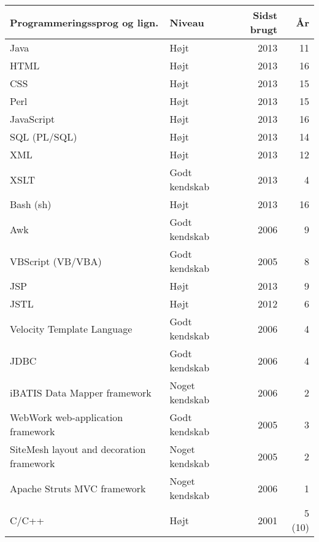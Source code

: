 \documentclass[a4paper,11pt]{article}
\begin{document}
\bigskip
\begin{tabularx}{\textwidth}{X l r r}
  \textbf{Programmeringssprog og lign.}  & \textbf{Niveau}  & \textbf{Sidst brugt}  & \textbf{År} \\
  \hline
  Java                                      & Højt            & 2013  &    11 \\
  HTML                                      & Højt            & 2013  &    16 \\
  CSS                                       & Højt            & 2013  &    15 \\
  Perl                                      & Højt            & 2013  &    15 \\
  JavaScript                                & Højt            & 2013  &    16 \\
  SQL (PL/SQL)                              & Højt            & 2013  &    14 \\
  XML                                       & Højt            & 2013  &    12 \\
  XSLT                                      & Godt kendskab   & 2013  &     4 \\
  Bash (sh)                                 & Højt            & 2013  &    16 \\
  Awk                                       & Godt kendskab   & 2006  &     9 \\
  VBScript (VB/VBA)                         & Godt kendskab   & 2005  &     8 \\
  JSP                                       & Højt            & 2013  &     9 \\
  JSTL                                      & Højt            & 2012  &     6 \\
  Velocity Template Language                & Godt kendskab   & 2006  &     4 \\
  JDBC                                      & Godt kendskab   & 2006  &     4 \\
  iBATIS Data Mapper framework              & Noget kendskab  & 2006  &     2 \\
  WebWork web-application framework         & Godt kendskab   & 2005  &     3 \\
  SiteMesh layout and decoration framework  & Noget kendskab  & 2005  &     2 \\
  Apache Struts MVC framework               & Noget kendskab  & 2006  &     1 \\
  C/C++                                     & Højt            & 2001  & 5 (10)\\

\end{tabularx}
\end{document}
